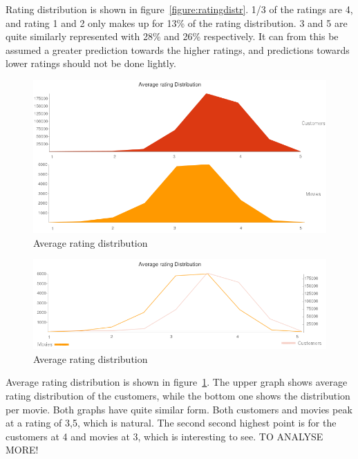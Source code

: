 Rating distribution is shown in figure~\ref{figure:ratingdistr}. 1/3 of the ratings are 4, and rating 1 and 2 only makes up for 13\% of the rating distribution. 3 and 5 are quite similarly represented with 28\% and 26\% respectively. It can from this be assumed a greater prediction towards the higher ratings, and predictions towards lower ratings should not be done lightly.

\begin{figure}[H]
\includegraphics[width=5in]{image/avgratingdistr.png}
\centering
\caption{Average rating distribution}
\label{figure:avgratingdistr}
\end{figure}

\begin{figure}[H]
\includegraphics[width=5in]{image/avgratdistrover.png}
\centering
\caption{Average rating distribution}
\label{figure:avgratdistrover}
\end{figure}


Average rating distribution is shown in figure~\ref{figure:avgratingdistr}. The upper graph shows average rating distribution of the customers, while the bottom one shows the distribution per movie. Both graphs have quite similar form. Both customers and movies peak at a rating of 3,5, which is natural. The second second highest point is for the customers at 4 and movies at 3, which is interesting to see. TO ANALYSE MORE!


